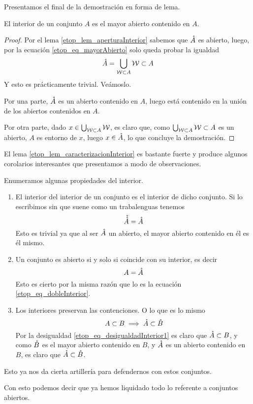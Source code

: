 Presentamos el final de la demostración en forma de lema.
\begin{lem}
	\label{etop_lem_caracterizacionInterior}
	El interior de un conjunto $A$ es el mayor abierto contenido en $A$.
\end{lem}
\begin{proof}
	Por el lema \ref{etop_lem_aperturaInterior} sabemos que $\mathring{A}$ es abierto, luego, por la ecuación \eqref{etop_eq_mayorAbierto} solo queda probar la igualdad
	\begin{equation*}
	\mathring{A}=\bigcup_{\mathcal{W}\subset A}\mathcal{W}\subset A
	\end{equation*}
	Y esto es prácticamente trivial. Veámoslo.
	
	Por una parte, $\mathring{A}$ es un abierto contenido en $A$, luego está contenido en la unión de los abiertos contenidos en $A$.
	
	Por otra parte, dado $x\in\bigcup_{\mathcal{W}\subset A}\mathcal{W}$, es claro que, como $\bigcup_{\mathcal{W}\subset A}\mathcal{W}\subset A$ es un abierto, $A$ es entorno de $x$, luego $x\in\mathring{A}$, lo que concluye la demostración.
\end{proof}

El lema \ref{etop_lem_caracterizacionInterior} es bastante fuerte y produce algunos corolarios interesantes que presentamos a modo de observaciones.
\begin{obs}
	\label{etop_obs_propiedadesInterior}
	Enumeramos algunas propiedades del interior.
	\begin{enumerate}
		\item El interior del interior de un conjunto es el interior de dicho conjunto. Si lo escribimos sin que suene como un trabalenguas tenemos
		\begin{equation}
		\label{etop_eq_dobleInterior}
		\mathring{\mathring{A}}=\mathring{A}
		\end{equation}
		Esto es trivial ya que al ser $\mathring{A}$ un abierto, el mayor abierto contenido en él es él mismo.
		\item Un conjunto es abierto si y solo si coincide con su interior, es decir
		\begin{equation}
		\label{etop_eq_abiertoInterior}
		A=\mathring{A}
		\end{equation}
		Esto es cierto por la misma razón que lo es la ecuación \eqref{etop_eq_dobleInterior}.
		\item Los interiores preservan las contenciones. O lo que es lo mismo
		\begin{equation}
		\label{etop_eq_interiorContencion}
		A\subset B\implies \mathring{A}\subset\mathring{B}
		\end{equation}
		Por la desigualdad \eqref{etop_eq_desigualdadInterior1} es claro que $\mathring{A}\subset B$, y como $\mathring{B}$ es el mayor abierto contenido en $B$, y $\mathring{A}$ es un abierto contenido en $B$, es claro que $\mathring{A}\subset\mathring{B}$.
	\end{enumerate}
	Esto ya nos da cierta artillería para defendernos con estos conjuntos.
\end{obs}
Con esto podemos decir que ya hemos liquidado todo lo referente a conjuntos abiertos.

